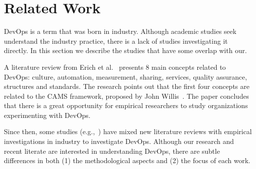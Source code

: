 \section{Related Work} \label{sec:related_work}

DevOps is a term that was born in industry. Although academic studies seek
understand the industry practice, there is a lack of studies investigating it
directly. In this section we describe the studies that have some overlap with our.

A literature review from Erich et al.~\cite{cooperation_dev_ops_esem_2014} presents 8
main concepts related to DevOps: culture, automation, measurement, sharing,
services, quality assurance, structures and standards. The research points out
that the first four concepts are
related to the CAMS framework, proposed by John Willis~\cite{what_devops_means_2010}.
The paper concludes that there is a great opportunity for empirical researchers
to study organizations experimenting with DevOps.

Since then, some studies (e.g.,~\cite{devops_a_definition_xp_15,dimensions_of_devops_xp_15,extending_dimensions_icsea_16,characterizing_devops_sbes_2016,qualitative_devops_journalsw_17})
have mixed new literature reviews with empirical investigations in industry to investigate DevOps.
Although our research and recent literate are interested in understanding DevOps,
there are subtle differences in both (1) the methodological aspects and (2) the focus
of each work.



